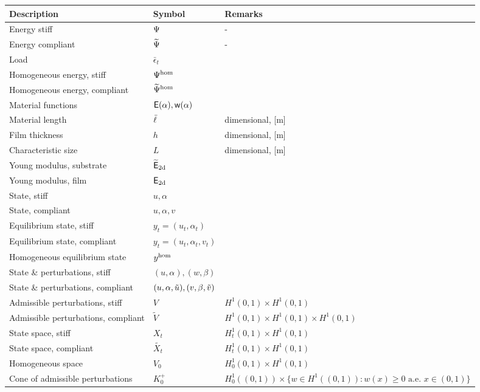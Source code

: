 \begin{table}[h!]
  \centering
  \begin{tabular}{  m{5.5cm}  m{3cm}  m{6cm}  }
    \hline
    \textbf{Description} & \textbf{Symbol} & \textbf{Remarks} \\
    \hline
    Energy stiff     & $\Psi$ & - \\
    Energy compliant & $\widetilde\Psi$ & - \\
    Load & $\bar\epsilon_t$ & \\
    Homogeneous energy, stiff   & $\Psi^\text{hom}$ & \\
    Homogeneous energy, compliant   & $\widetilde\Psi^\text{hom}$ & \\
    Material functions &  $\mathsf E(\alpha), \mathsf{w}(\alpha)$ & \\
    Material length & $\bar{\ell}$ & dimensional, [m]\\
    Film thickness & $h$ & dimensional, [m]\\
    Characteristic size & $L$ & dimensional, [m]\\
    Young modulus, substrate & ${\mathsf{\widetilde E_{\text{2d}}}}$ & \\
    Young modulus, film & $\mathsf{E_{\text{2d}}}$ & \\
    State, stiff& $u, \alpha$ & \\
    State, compliant& $u, \alpha, v$ & \\
    Equilibrium state, stiff& $y_t=(u_t, \alpha_t)$ & \\
    Equilibrium state, compliant & $y_t=(u_t, \alpha_t, v_t)$ & \\
    Homogeneous equilibrium state  & $y^{\text{hom}}$ & \\
    State \& perturbations, stiff & $(u,\alpha), (w, \beta)$ & \\
    State \& perturbations, compliant & $(u, \alpha, \tilde u), (v, \beta, \tilde v)$ & \\
    Admissible perturbations, stiff& $V$ & $H^1(0,1)\times  H^1(0,1)$\\
    Admissible perturbations, compliant& $\widetilde{V}$ & $H^1(0,1)\times  H^1(0,1)\times  H^1(0,1)$\\
    State space, stiff& $X_t$ & $H^1_t(0,1)\times  H^1(0,1)$\\
    State space, compliant& $\widetilde{X_t}$ & $H^1_t(0,1)\times  H^1(0,1)$\\
    Homogeneous space& $V_0$ & $H^1_0(0,1)\times  H^1(0,1)$\\
    Cone of admissible perturbations& $K^+_0$ & $H^1_0((0, 1))\times \{w \in H^1((0, 1)): w(x) \geq 0 \text{ a.e. }x\in (0, 1)\}$\\

\end{tabular}
\end{table}
